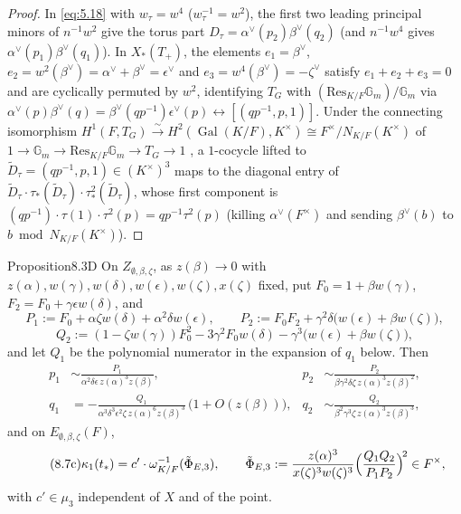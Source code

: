 \documentclass[12pt,letterpaper]{amsart}
\theoremstyle{plain}
\theoremstyle{definition}
\theoremstyle{remark}
\theoremstyle{definition}
\newcommand{\gga}{\mathbb{G}}
\DeclareMathOperator{\Gal}{Gal}
\begin{document}
\begin{proof}
In \eqref{eq:5.18} with $w_\tau=w^4$ ($w_\tau^{-1}=w^2$), the first two leading
principal minors of $n^{-1}w^2$ give the torus part
$D_\tau=\alpha^\vee(p_2)\beta^\vee(q_2)$ (and $n^{-1}w^4$ gives
$\alpha^\vee(p_1)\beta^\vee(q_1)$). In $X_*(T_+)$, the elements
$e_1=\beta^\vee$, $e_2=w^2(\beta^\vee)=\alpha^\vee+\beta^\vee=\epsilon^\vee$ and
$e_3=w^4(\beta^\vee)=-\zeta^\vee$ satisfy $e_1+e_2+e_3=0$ and are cyclically
permuted by $w^2$, identifying $T_G$ with $(\mathrm{Res}_{K/F}\gga_m)/\gga_m$ via
$\alpha^\vee(p)\beta^\vee(q)=\beta^\vee(qp^{-1})\epsilon^\vee(p)\leftrightarrow[(qp^{-1},p,1)]$.
Under the connecting isomorphism
$H^1(F,T_G)\xrightarrow{\sim}H^2(\Gal(K/F),K^\times)\cong F^\times/N_{K/F}(K^\times)$
of $1\to\gga_m\to\mathrm{Res}_{K/F}\gga_m\to T_G\to 1$ \cite[Ch.~XIV, \S1]{Ser79},
a $1$-cocycle lifted to $\tilde D_\tau=(qp^{-1},p,1)\in(K^\times)^3$ maps to the
diagonal entry of $\tilde D_\tau\cdot\tau_*(\tilde D_\tau)\cdot\tau_*^2(\tilde D_\tau)$,
whose first component is $(qp^{-1})\cdot\tau(1)\cdot\tau^2(p)=qp^{-1}\tau^2(p)$
(killing $\alpha^\vee(F^\times)$ and sending $\beta^\vee(b)$ to
$b\bmod N_{K/F}(K^\times)$).
\end{proof}

\begin{res}{Proposition}{8.3D}\label{res:8.3D}
On $Z_{\emptyset,\beta,\zeta}$, as $z(\beta)\to 0$ with
$z(\alpha),w(\gamma),w(\delta),w(\epsilon),w(\zeta),x(\zeta)$ fixed, put
$F_0=1+\beta w(\gamma)$, $F_2=F_0+\gamma\epsilon w(\delta)$, and
\[
P_1:=F_0+\alpha\zeta w(\delta)+\alpha^2\delta w(\epsilon),\qquad
P_2:=F_0F_2+\gamma^2\delta\bigl(w(\epsilon)+\beta w(\zeta)\bigr),
\]
\[
Q_2:=(1-\zeta w(\gamma))F_0^2-3\gamma^2F_0w(\delta)-\gamma^3\bigl(w(\epsilon)+\beta w(\zeta)\bigr),
\]
and let $Q_1$ be the polynomial numerator in the expansion of $q_1$ below.
Then
\begin{align*}
p_1&\sim\frac{P_1}{\alpha^2\delta\epsilon\,z(\alpha)^3z(\beta)}, &
p_2&\sim\frac{P_2}{\beta\gamma^2\delta\zeta\,z(\alpha)^3z(\beta)^2},\\
q_1&=-\frac{Q_1}{\alpha^3\delta^3\epsilon^2\zeta\,z(\alpha)^6z(\beta)^3}\,\bigl(1+O(z(\beta))\bigr), &
q_2&\sim\frac{Q_2}{\beta^2\gamma^3\zeta\,z(\alpha)^3z(\beta)^3},
\end{align*}
and on $E_{\emptyset,\beta,\zeta}(F)$,
\begin{equation}\tag{8.7c}\label{eq:8.7c}
\kappa_1(t_*)=c'\cdot\omega_{K/F}^{-1}(\tilde\Phi_{E,3}),\qquad
\tilde\Phi_{E,3}:=\frac{z(\alpha)^3}{x(\zeta)^3w(\zeta)^3}
\Bigl(\frac{Q_1Q_2}{P_1P_2}\Bigr)^{\!2}\in F^\times,
\end{equation}
with $c'\in\mu_3$ independent of $X$ and of the point.
\end{res}
\end{document}
